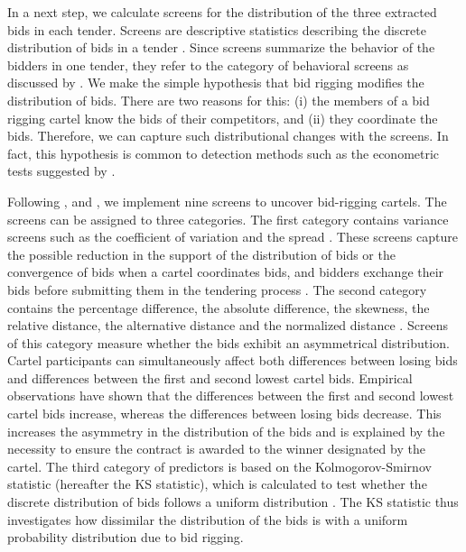 \documentclass[a4paper,11pt]{article}
\begin{document}
	In a next step, we calculate screens for the distribution of the three extracted bids in each tender. Screens are descriptive statistics describing the discrete distribution of bids in a tender \citep[][]{Abrantes2006,Abrantes2012,Harrington2008,Jimenez2012,imhof2019detecting}. Since screens summarize the behavior of the bidders in one tender, they refer to the category of behavioral screens as discussed by \cite{Harrington2008}. We make the simple hypothesis that bid rigging modifies the distribution of bids. There are two reasons for this: (i) the members of a bid rigging cartel know the bids of their competitors, and (ii) they coordinate the bids. Therefore, we can capture such distributional changes with the screens. In fact, this hypothesis is common to detection methods such as the econometric tests suggested by \cite{Bajari2003}. 
	
	Following \cite{huber2020transnational}, \cite{huber2019machine} and \cite{wallimann2020machine}, we implement nine screens to uncover bid-rigging cartels. The screens can be assigned to three categories. The first category contains variance screens such as the coefficient of variation \citep[see e.g.][]{Abrantes2006,Abrantes2012,imhof2019detecting,Jimenez2012} and the spread \citep[see e.g.][]{wallimann2020machine}. These screens capture the possible reduction in the support of the distribution of bids or the convergence of bids when a cartel coordinates bids, and bidders exchange their bids before submitting them in the tendering process \citep[][]{imhof2019detecting}. The second category contains the percentage difference, the absolute difference, the skewness, the relative distance, the alternative distance and the normalized distance \citep[see for these screens][]{huber2019machine}. Screens of this category measure whether the bids exhibit an asymmetrical distribution. Cartel participants can simultaneously affect both differences between losing bids and differences between the first and second lowest cartel bids. Empirical observations \citep[see e.g.][]{Chassang2020} have shown that the differences between the first and second lowest cartel bids increase, whereas the differences between losing bids decrease. This increases the asymmetry in the distribution of the bids and is explained by the necessity to ensure the contract is awarded to the winner designated by the cartel. The third category of predictors is based on the Kolmogorov-Smirnov statistic (hereafter the KS statistic), which is calculated to test whether the discrete distribution of bids follows a uniform distribution \citep[see][]{wallimann2020machine}. The KS statistic thus investigates how dissimilar the distribution of the bids is with a uniform probability distribution due to bid rigging.
	
\end{document}
